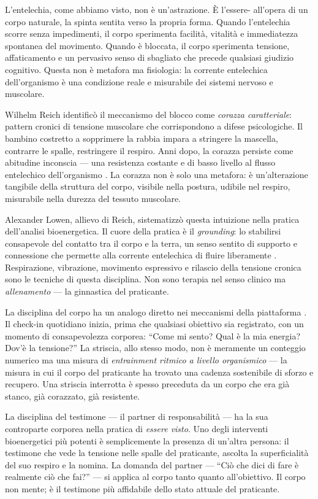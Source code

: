 L'entelechia, come abbiamo visto, non \`e un'astrazione. \`E l'essere-
all'opera di un corpo naturale, la spinta sentita verso la propria forma.
Quando l'entelechia scorre senza impedimenti, il corpo sperimenta
facilit\`a, vitalit\`a e immediatezza spontanea del movimento. Quando
\`e bloccata, il corpo sperimenta tensione, affaticamento e un pervasivo
senso di sbagliato che precede qualsiasi giudizio cognitivo. Questa non
\`e metafora ma fisiologia: la corrente entelechica dell'organismo \`e
una condizione reale e misurabile dei sistemi nervoso e muscolare.

Wilhelm Reich identific\`o il meccanismo del blocco come \emph{corazza
caratteriale}: pattern cronici di tensione muscolare che corrispondono
a difese psicologiche. Il bambino costretto a sopprimere la rabbia impara
a stringere la mascella, contrarre le spalle, restringere il respiro.
Anni dopo, la corazza persiste come abitudine inconscia --- una
resistenza costante e di basso livello al flusso entelechico
dell'organismo \parencite{reich1933character}. La corazza non \`e
solo una metafora: \`e un'alterazione tangibile della struttura del
corpo, visibile nella postura, udibile nel respiro, misurabile nella
durezza del tessuto muscolare.

Alexander Lowen, allievo di Reich, sistematizz\`o questa intuizione
nella pratica dell'analisi bioenergetica. Il cuore della pratica \`e il
\emph{grounding}: lo stabilirsi consapevole del contatto tra il corpo
e la terra, un senso sentito di supporto e connessione che permette alla
corrente entelechica di fluire liberamente \parencite{lowen1975bioenergetics}.
Respirazione, vibrazione, movimento espressivo e rilascio della tensione
cronica sono le tecniche di questa disciplina. Non sono terapia nel senso
clinico ma \emph{allenamento} --- la ginnastica del praticante.

La disciplina del corpo ha un analogo diretto nei meccanismi della
piattaforma \praxis. Il check-in quotidiano inizia, prima che qualsiasi
obiettivo sia registrato, con un momento di consapevolezza corporea:
``Come mi sento? Qual \`e la mia energia? Dov'\`e la tensione?'' La
striscia, allo stesso modo, non \`e meramente un conteggio numerico ma
una misura di \emph{entrainment ritmico a livello organismico} --- la
misura in cui il corpo del praticante ha trovato una cadenza sostenibile
di sforzo e recupero. Una striscia interrotta \`e spesso preceduta da
un corpo che era gi\`a stanco, gi\`a corazzato, gi\`a resistente.

La disciplina del testimone --- il partner di responsabilit\`a --- ha
la sua controparte corporea nella pratica di \emph{essere visto}. Uno
degli interventi bioenergetici pi\`u potenti \`e semplicemente la
presenza di un'altra persona: il testimone che vede la tensione nelle
spalle del praticante, ascolta la superficialit\`a del suo respiro e
la nomina. La domanda del partner --- ``Ci\`o che dici di fare \`e
realmente ci\`o che fai?'' --- si applica al corpo tanto quanto
all'obiettivo. Il corpo non mente; \`e il testimone pi\`u affidabile
dello stato attuale del praticante.


